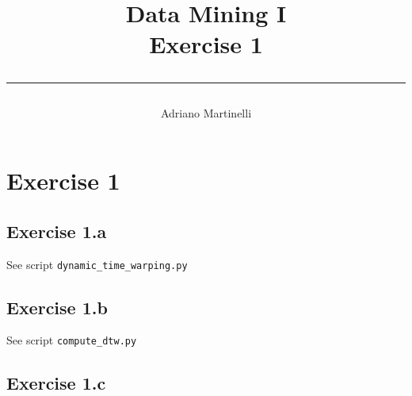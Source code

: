 \documentclass[11pt,a4paper]{article}
\author{Adriano Martinelli}
\title{Data Mining I\\
	Exercise 1\\
\rule{0.75\linewidth}{0.5pt}}
\begin{document}
\maketitle
\tableofcontents
\newpage


\section{Exercise 1}
\subsection{Exercise 1.a}
See script \texttt{dynamic\_time\_warping.py}

\subsection{Exercise 1.b}
See script \texttt{compute\_dtw.py}

\subsection{Exercise 1.c}





\end{document}
